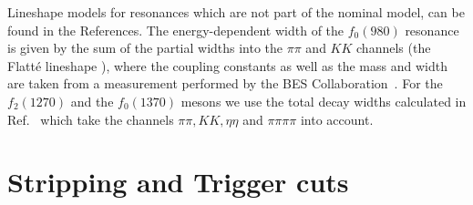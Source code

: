 Lineshape models for resonances which are not part of the nominal model, can be found in the References.
The energy-dependent width of the $f_{0}(980)$ resonance is given by the sum of the partial widths into the $\pi\pi$ and $KK$ channels (\ie the Flatt\'{e} lineshape \cite{Flatte}),
where the coupling constants %
as well as the mass and width are taken from a measurement performed by the BES Collaboration~\cite{Flatte2}.
For the $f_{2}(1270)$ and the $f_{0}(1370)$ mesons we use the total decay widths
calculated in Ref.~\cite{dArgent:2017gzv} which take the channels $\pi  \pi, K  K, \eta  \eta$ and $\pi \pi \pi \pi$ into account. 	



\clearpage
\section{Stripping and Trigger cuts}
\label{sec:StripAndTrigger}

\setcounter{figure}{0}
\setcounter{table}{0}
\renewcommand{\thefigure}{B.\arabic{figure}}
\renewcommand{\thetable}{B.\arabic{table}}

